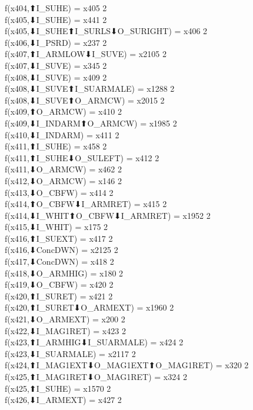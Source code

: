f(x404,⬆I_SUHE) = x405 {2} \\
f(x405,⬇I_SUHE) = x441 {2} \\
f(x405,⬇I_SUHE⬆I_SURLS⬇O_SURIGHT) = x406 {2} \\
f(x406,⬇I_PSRD) = x237 {2} \\
f(x407,⬆I_ARMLOW⬇I_SUVE) = x2105 {2} \\
f(x407,⬇I_SUVE) = x345 {2} \\
f(x408,⬇I_SUVE) = x409 {2} \\
f(x408,⬇I_SUVE⬆I_SUARMALE) = x1288 {2} \\
f(x408,⬇I_SUVE⬆O_ARMCW) = x2015 {2} \\
f(x409,⬆O_ARMCW) = x410 {2} \\
f(x409,⬇I_INDARM⬆O_ARMCW) = x1985 {2} \\
f(x410,⬇I_INDARM) = x411 {2} \\
f(x411,⬆I_SUHE) = x458 {2} \\
f(x411,⬆I_SUHE⬇O_SULEFT) = x412 {2} \\
f(x411,⬇O_ARMCW) = x462 {2} \\
f(x412,⬇O_ARMCW) = x146 {2} \\
f(x413,⬇O_CBFW) = x414 {2} \\
f(x414,⬆O_CBFW⬇I_ARMRET) = x415 {2} \\
f(x414,⬇I_WHIT⬆O_CBFW⬇I_ARMRET) = x1952 {2} \\
f(x415,⬇I_WHIT) = x175 {2} \\
f(x416,⬆I_SUEXT) = x417 {2} \\
f(x416,⬇ConcDWN) = x2125 {2} \\
f(x417,⬇ConcDWN) = x418 {2} \\
f(x418,⬇O_ARMHIG) = x180 {2} \\
f(x419,⬇O_CBFW) = x420 {2} \\
f(x420,⬆I_SURET) = x421 {2} \\
f(x420,⬆I_SURET⬇O_ARMEXT) = x1960 {2} \\
f(x421,⬇O_ARMEXT) = x200 {2} \\
f(x422,⬇I_MAG1RET) = x423 {2} \\
f(x423,⬆I_ARMHIG⬇I_SUARMALE) = x424 {2} \\
f(x423,⬇I_SUARMALE) = x2117 {2} \\
f(x424,⬆I_MAG1EXT⬇O_MAG1EXT⬆O_MAG1RET) = x320 {2} \\
f(x425,⬆I_MAG1RET⬇O_MAG1RET) = x324 {2} \\
f(x425,⬆I_SUHE) = x1570 {2} \\
f(x426,⬇I_ARMEXT) = x427 {2} \\
